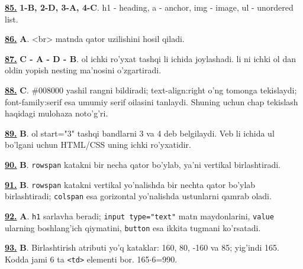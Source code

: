 \documentclass[10pt,a4paper,oneside]{article}
\begin{document}
\par\vspace{3mm}
\noindent\hyperlink{q85}{\textbf{85.}} \textbf{1-B, 2-D, 3-A, 4-C}.  h1 - heading, a - anchor, img - image, ul - unordered list.
\par\vspace{3mm}
\noindent\hyperlink{q86}{\textbf{86.}} \textbf{A}.  \textless{}br\textgreater{} matnda qator uzilishini hosil qiladi.
\par\vspace{3mm}
\noindent\hyperlink{q87}{\textbf{87.}} \textbf{C - A - D - B}.  ol ichki ro'yxat tashqi li ichida joylashadi. li ni ichki ol dan oldin yopish nesting ma'nosini o'zgartiradi.
\par\vspace{3mm}
\noindent\hyperlink{q88}{\textbf{88.}} \textbf{C}.  \#008000 yashil rangni bildiradi; text-align:right o'ng tomonga tekislaydi; font-family:serif esa umumiy serif oilasini tanlaydi. Shuning uchun chap tekislash haqidagi mulohaza noto'g'ri.
\par\vspace{3mm}
\noindent\hyperlink{q89}{\textbf{89.}} \textbf{B}.  ol start="3" tashqi bandlarni 3 va 4 deb belgilaydi. Veb li ichida ul bo'lgani uchun HTML/CSS uning ichki ro'yxatidir.
\par\vspace{3mm}
\noindent\hyperlink{q90}{\textbf{90.}} \textbf{B}.  \texttt{rowspan} katakni bir necha qator bo'ylab, ya'ni vertikal birlashtiradi.
\par\vspace{3mm}
\noindent\hyperlink{q91}{\textbf{91.}} \textbf{B}.  \texttt{rowspan} katakni vertikal yo'nalishda bir nechta qator bo'ylab birlashtiradi; \texttt{colspan} esa gorizontal yo'nalishda ustunlarni qamrab oladi.
\par\vspace{3mm}
\noindent\hyperlink{q92}{\textbf{92.}} \textbf{A}.  \texttt{h1} sarlavha beradi; \texttt{input type="text"} matn maydonlarini, \texttt{value} ularning boshlang'ich qiymatini, \texttt{button} esa ikkita tugmani ko'rsatadi.
\par\vspace{3mm}
\noindent\hyperlink{q93}{\textbf{93.}} \textbf{B}.  Birlashtirish atributi yo'q kataklar: 160, 80, -160 va 85; yig'indi 165. Kodda jami 6 ta \texttt{\textless{}td\textgreater{}} elementi bor. 165\(\cdot\)6=990.
\end{document}
